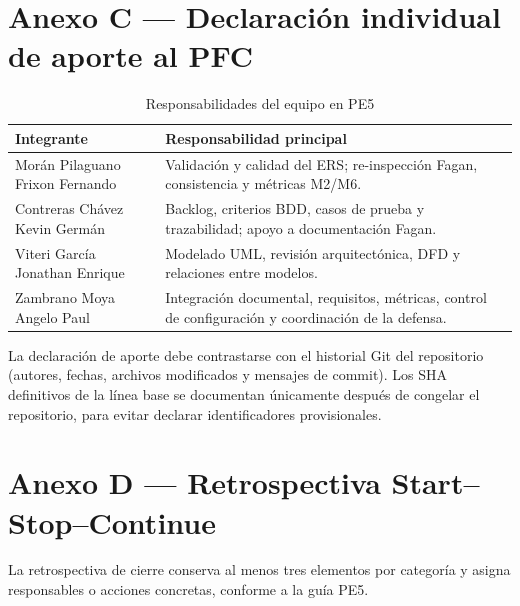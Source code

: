 \documentclass[12pt,a4paper]{article}
\begin{document}
\section*{Anexo C — Declaración individual de aporte al PFC}
\begin{table}[H]\centering\caption{Responsabilidades del equipo en PE5}\begin{tabularx}{\textwidth}{p{}X}\toprule
\textbf{Integrante}&\textbf{Responsabilidad principal}\\\midrule
Morán Pilaguano Frixon Fernando&Validación y calidad del ERS; re-inspección Fagan, consistencia y métricas M2/M6.\\
Contreras Chávez Kevin Germán&Backlog, criterios BDD, casos de prueba y trazabilidad; apoyo a documentación Fagan.\\
Viteri García Jonathan Enrique&Modelado UML, revisión arquitectónica, DFD y relaciones entre modelos.\\
Zambrano Moya Angelo Paul&Integración documental, requisitos, métricas, control de configuración y coordinación de la defensa.\\\bottomrule
\end{tabularx}\end{table}
La declaración de aporte debe contrastarse con el historial Git del repositorio (autores, fechas, archivos modificados y mensajes de commit). Los SHA definitivos de la línea base se documentan únicamente después de congelar el repositorio, para evitar declarar identificadores provisionales.
\clearpage

\section*{Anexo D — Retrospectiva Start--Stop--Continue}
La retrospectiva de cierre conserva al menos tres elementos por categoría y asigna responsables o acciones concretas, conforme a la guía PE5.
\end{document}
